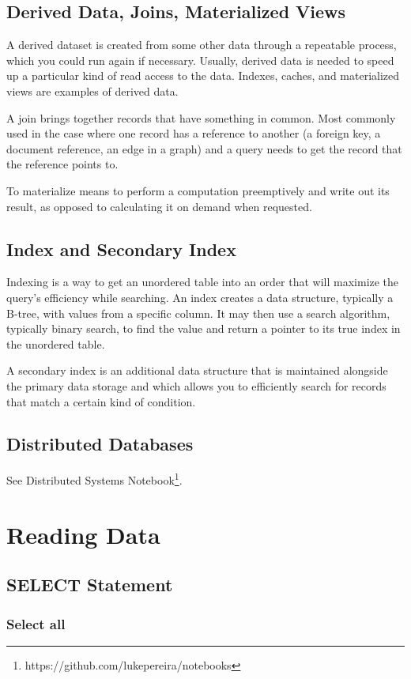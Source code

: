 \documentclass{article}
\begin{document}
\subsection{Derived Data, Joins, Materialized Views}
    A derived dataset is created from some other data through a repeatable process, which you could run again if necessary. Usually, derived data is needed to speed up a particular kind of read access to the data.  Indexes, caches, and materialized views are examples of derived data.
    
    A join brings together records that have something in common. Most commonly used in the case where one record has a reference to another (a foreign key, a document reference, an edge in a graph) and a query needs to get the record that the reference points to.
    
    To materialize means to perform a computation preemptively and write out its result, as opposed to calculating it on demand when requested.
    
\subsection{Index and Secondary Index}
    Indexing is a way to get an unordered table into an order that will maximize the query’s efficiency while searching. An index creates a data structure, typically a B-tree, with values from a specific column. It may then use a search algorithm, typically binary search, to find the value and return a pointer to its true index in the unordered table.
    
    A secondary index is an additional data structure that is maintained alongside the primary data storage and which allows you to efficiently search for records that match a certain kind of condition.

\subsection{Distributed Databases}
    See Distributed Systems Notebook\footnote{https://github.com/lukepereira/notebooks}.

\newpage
\section{Reading Data}
\subsection{SELECT Statement}
\subsubsection{Select all}
\end{document}

